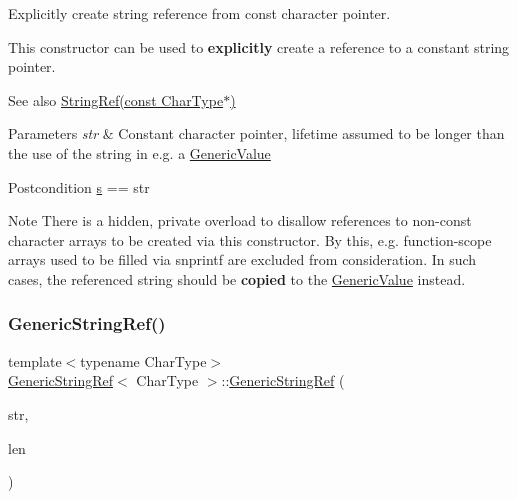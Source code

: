 Explicitly create string reference from {\ttfamily const} character pointer. 

This constructor can be used to {\bfseries explicitly} create a reference to a constant string pointer.

\begin{DoxySeeAlso}{See also}
\hyperlink{structGenericStringRef_aa6b9fd9f6aa49405a574c362ba9af6b5}{String\+Ref(const Char\+Type$\ast$)}
\end{DoxySeeAlso}

\begin{DoxyParams}{Parameters}
{\em str} & Constant character pointer, lifetime assumed to be longer than the use of the string in e.\+g. a \hyperlink{classGenericValue}{Generic\+Value}\\
\hline
\end{DoxyParams}
\begin{DoxyPostcond}{Postcondition}
\hyperlink{structGenericStringRef_ac555994afd329bc9bc1780acf2f9d9be}{s} == str
\end{DoxyPostcond}
\begin{DoxyNote}{Note}
There is a hidden, private overload to disallow references to non-\/const character arrays to be created via this constructor. By this, e.\+g. function-\/scope arrays used to be filled via {\ttfamily snprintf} are excluded from consideration. In such cases, the referenced string should be {\bfseries copied} to the \hyperlink{classGenericValue}{Generic\+Value} instead. 
\end{DoxyNote}
\mbox{\label{structGenericStringRef_a8b2c6a7fdc4da1e7055f7fdcf0ac517f}} 
\subsubsection{\texorpdfstring{Generic\+String\+Ref()}{GenericStringRef()}\hspace{0.1cm}{\footnotesize\ttfamily [3/5]}}
{\footnotesize\ttfamily template$<$typename Char\+Type$>$ \\
\hyperlink{structGenericStringRef}{Generic\+String\+Ref}$<$ Char\+Type $>$\+::\hyperlink{structGenericStringRef}{Generic\+String\+Ref} (\begin{DoxyParamCaption}\item[{const Char\+Type $\ast$}]{str,  }\item[{\hyperlink{rapidjson_8h_a5ed6e6e67250fadbd041127e6386dcb5}{Size\+Type}}]{len }\end{DoxyParamCaption})\hspace{0.3cm}{\ttfamily [inline]}}



